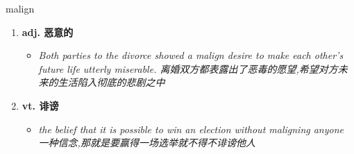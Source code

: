 
\begin{frame}
{\huge malign}
\begin{center}
\begin{enumerate}\Large
  \item \textbf{adj. 恶意的}
  \begin{itemize}
    \item \em{\Large{Both parties to the divorce showed a malign desire to make each other's future life utterly miserable. 离婚双方都表露出了恶毒的愿望,希望对方未来的生活陷入彻底的悲剧之中}}
  \end{itemize}
  \item \textbf{vt. 诽谤}
  \begin{itemize}
    \item \em{\Large{the belief that it is possible to win an election without maligning anyone 一种信念,那就是要赢得一场选举就不得不诽谤他人}}
  \end{itemize}
\end{enumerate}
\end{center}
\end{frame}
